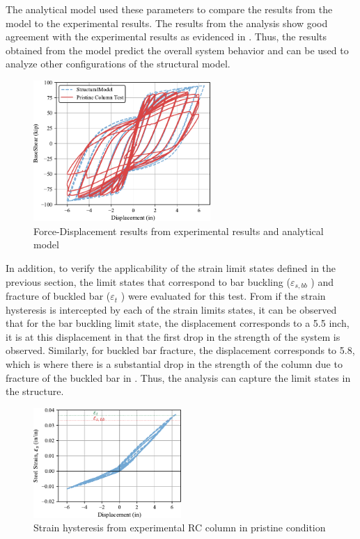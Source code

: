 The analytical model used these parameters to compare the results from the model to the experimental results. The results from the analysis show good agreement with the experimental results as evidenced in . Thus, the results obtained from the model predict the overall system behavior and can be used to analyze other configurations of the structural model.

\begin{figure}[htbp]
	\centering
	\includegraphics[width=0.60\textwidth]{Chapter-5/figs/Calibration_Test_26_Goodnight_et_al.pdf}
	\caption{Force-Displacement results from experimental results \cite{Goodnight2013} and analytical model}
	\label{fig:ModelCalibration}
\end{figure}

In addition, to verify the applicability of the strain limit states defined in the previous section, the limit states that correspond to bar buckling ($\varepsilon_{s,bb}$ ) and fracture of buckled bar ($\varepsilon_{t}$ )  were evaluated for this test. From  if the strain hysteresis is intercepted by each of the strain limits states, it can be observed that for the bar buckling limit state, the displacement corresponds to a 5.5 inch, it is at this displacement in  that the first drop in the strength of the system is observed. Similarly, for buckled bar fracture, the displacement corresponds to 5.8, which is where there is a substantial drop in the strength of the column due to fracture of the buckled bar in . Thus, the analysis can capture the limit states in the structure. 

\begin{figure}[htbp]
	\centering
	\includegraphics[width=0.5\textwidth]{VAC Thesis 2.0/Chapter-5/figs/Calibration_Test_26_Goodnight_et_al_strain.pdf}
	\caption{Strain hysteresis from experimental RC column in pristine condition}
	\label{fig:ModelCalibration_Pristine_Hysteresis}
\end{figure}

